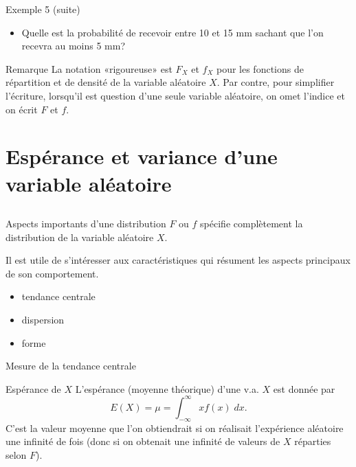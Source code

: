 \documentclass[handout]{BeamerTemplate}
\begin{document}
\begin{frame}[t]{Exemple 5 (suite)}
\begin{itemize}
\item Quelle est la probabilité de recevoir entre 10 et 15 mm sachant que l'on recevra au moins 5 mm?
\end{itemize}

\end{frame}

\begin{frame}{Remarque}
    La notation «rigoureuse» est $F_X$ et $f_X$ pour les fonctions de répartition et de densité de la variable aléatoire $X$. Par contre, pour simplifier l'écriture, lorsqu'il est question d'une seule variable aléatoire, on omet l'indice et on écrit $F$ et $f$.
\end{frame}

\section[Espérance-Variance]{Espérance et variance d'une variable aléatoire}

\subsection*{ }

\begin{frame}[t]{Aspects importants d'une distribution}
$F$ ou $f$ spécifie complètement la distribution de la variable aléatoire $X$.

\medskip
Il est utile de s'intéresser aux caractéristiques qui résument les aspects
principaux de son comportement.

\medskip
\begin{itemize}\itemsep2mm
\item tendance centrale
\item dispersion
\item forme
\end{itemize}

\end{frame}

\begin{frame}[t]{Mesure de la tendance centrale}%

\begin{Boite}{Espérance de $X$}
 L'\alert{espérance} (moyenne théorique) d'une v.a. $X$ est donnée par
 $$
 E(X)=\mu=\int_{-\infty}^\infty xf(x)\;dx.$$
C'est la valeur moyenne que l'on obtiendrait si on réalisait l'expérience aléatoire une infinité de fois (donc si on obtenait une infinité de valeurs de $X$ réparties selon $F$).
\end{Boite}

\end{frame}
\end{document}
